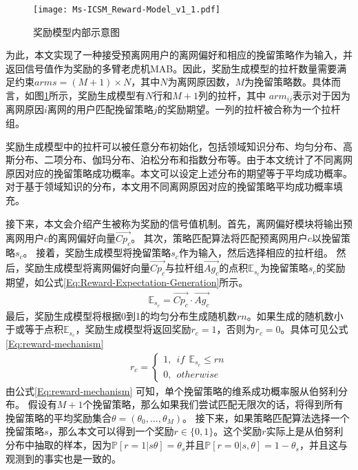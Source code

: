 \begin{figure}[hbt]
	\centering
	\texttt{[image: Ms-ICSM\_Reward-Model\_v1\_1.pdf]}
	\caption{奖励模型内部示意图}
	\label{Fig:Reward-Model}
\end{figure}

为此，本文实现了一种接受预离网用户的离网偏好和相应的挽留策略作为输入，并返回信号值作为奖励的多臂老虎机MAB。因此，奖励生成模型的拉杆数量需要满足约束$arms = (M + 1) \times N$，其中$N$为离网原因数，$M$为挽留策略数。具体而言，如图\ref{Fig:Reward-Model}所示，奖励生成模型有$N$行和$M+1$列的拉杆，其中 $arm_{ij}$表示对于因为离网原因$i$离网的用户匹配挽留策略$j$的奖励期望。一列的拉杆被合称为一个拉杆组。\par
奖励生成模型中的拉杆可以被任意分布初始化，包括领域知识分布、均匀分布、高斯分布、二项分布、伽玛分布、泊松分布和指数分布等。由于本文统计了不同离网原因对应的挽留策略成功概率。本文可以设定上述分布的期望等于平均成功概率。对于基于领域知识的分布，本文用不同离网原因对应的挽留策略平均成功概率填充。\par
	
	接下来，本文会介绍产生被称为奖励的信号值机制。首先，离网偏好模块将输出预离网用户$c$的离网偏好向量$\vec{Cp_{c}}$。
	其次，策略匹配算法将匹配预离网用户$c$以挽留策略$s_{c}$。
	接着，奖励生成模型将挽留策略$s_{c}$作为输入，然后选择相应的拉杆组。
	然后，奖励生成模型将离网偏好向量$\vec{Cp_{c}}$与拉杆组$\vec{Ag_{c}}$的点积$\mathbb{E}_{s_{c}}$为挽留策略$s_{c}$的奖励期望，如公式\eqref{Eq:Reward-Expectation-Generation}所示。	 
\begin{equation}
	\begin{aligned}
		\mathbb{E}_{s_{c}} = \vec{Cp_{c}} \cdot \vec{Ag_{c}}
	\end{aligned}
	\label{Eq:Reward-Expectation-Generation}
\end{equation}
最后，奖励生成模型将根据0到1的均匀分布生成随机数$rn$。如果生成的随机数小于或等于点积$\mathbb{E}_{s_{c}}$，奖励生成模型将返回奖励$r_{c}=1$，否则为$r_{c}=0$。具体可见公式\eqref{Eq:reward-mechanism} 
\begin{equation}
	\begin{aligned}
		r_{c} = 
		\begin{cases}
			1, ~~if ~~ \mathbb{E}_{s_{c}} \leq rn \\
			0 ,~~otherwise
		\end{cases}
	\end{aligned}
	\label{Eq:reward-mechanism}
\end{equation}		
由公式\eqref{Eq:reward-mechanism} 可知，单个挽留策略的维系成功概率服从伯努利分布。
假设有$M+1$个挽留策略，那么如果我们尝试匹配无限次的话，将得到所有挽留策略的平均奖励集合$\theta = (\theta_{0}, ..., \theta_{M})$。
接下来，如果策略匹配算法选择一个挽留策略$s$，那么本文可以得到一个奖励$r \in \{0, 1\}$。这个奖励$r$实际上是从伯努利分布中抽取的样本，因为$\mathbb{P}[r=1|s \theta] = \theta_{s} $并且$\mathbb{P}[r=0|s, \theta] = 1-\theta_{s} $，并且这与观测到的事实也是一致的。


